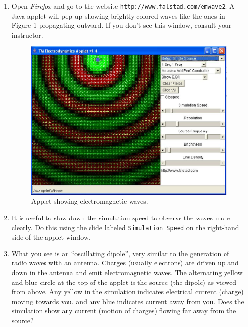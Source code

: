 \begin{enumerate}

\item Open \textit{Firefox} and go to the website
\verb!http://www.falstad.com/emwave2!. A Java applet will pop up showing
brightly colored waves like the ones in Figure 1 propagating outward. 
If you don't see this window, consult your instructor.
\begin{figure}[hbt]
\begin{center}
\includegraphics[width=6.0in]{plane_waves/emwaves1.eps}
\caption{Applet showing electromagnetic waves.}
\end{center}
\end{figure}

\item It is useful to slow down the simulation speed to observe the waves more clearly.
Do this using the slide labeled
\texttt{Simulation Speed} on the right-hand side of the applet window.

\item What you see is an ``oscillating dipole'', very similar to the generation of radio waves with an antenna.
Charges (usually electrons) are driven up and down in the antenna and emit electromagnetic 
waves.  
The alternating yellow and blue circle at the top of the applet is the source (the dipole)
as viewed from above.  Any yellow in the simulation indicates electrical current (charge) moving towards you, and any blue indicates current away from you.  Does the simulation show any current (motion of charges) flowing far away from the source?
\vspace{1.5cm}


\end{enumerate}
